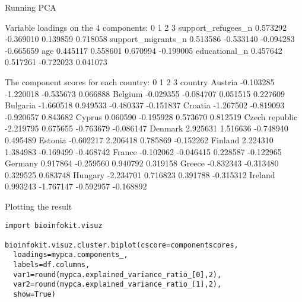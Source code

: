 \begin{frame}{Running PCA}
\begin{lstlistingoutputtiny}
Variable loadings on the 4 components:
                           0         1         2         3
support_refugees_n  0.573292 -0.369010  0.139859  0.718058
support_migrants_n  0.513586 -0.533140 -0.094283 -0.665659
age                 0.445117  0.558601  0.670994 -0.199005
educational_n       0.457642  0.517261 -0.722023  0.041073


The component scores for each country:
                       0         1         2         3
country                                               
Austria        -0.103285 -1.220018 -0.535673  0.066888
Belgium        -0.029355 -0.084707  0.051515  0.227609
Bulgaria       -1.660518  0.949533 -0.480337 -0.151837
Croatia        -1.267502 -0.819093 -0.920657  0.843682
Cyprus          0.060590 -0.195928  0.573670  0.812519
Czech republic -2.219795  0.675655 -0.763679 -0.086147
Denmark         2.925631  1.516636 -0.748940  0.495489
Estonia        -0.602217  2.206418  0.785869 -0.152262
Finland         2.224310  1.384983 -0.169499 -0.468742
France         -0.102062 -0.046415  0.228587 -0.122965
Germany         0.917864 -0.259560  0.940792  0.319158
Greece         -0.832343 -0.313480  0.329525  0.683748
Hungary        -2.234701  0.716823  0.391788 -0.315312
Ireland         0.993243 -1.767147 -0.592957 -0.168892
\end{lstlistingoutputtiny}
\end{frame}









\begin{frame}{Plotting the result}
  \begin{verbatim}
import bioinfokit.visuz
   
bioinfokit.visuz.cluster.biplot(cscore=componentscores, 
  loadings=mypca.components_, 
  labels=df.columns, 
  var1=round(mypca.explained_variance_ratio_[0],2), 
  var2=round(mypca.explained_variance_ratio_[1],2), 
  show=True)  
\end{verbatim}


\end{frame}



